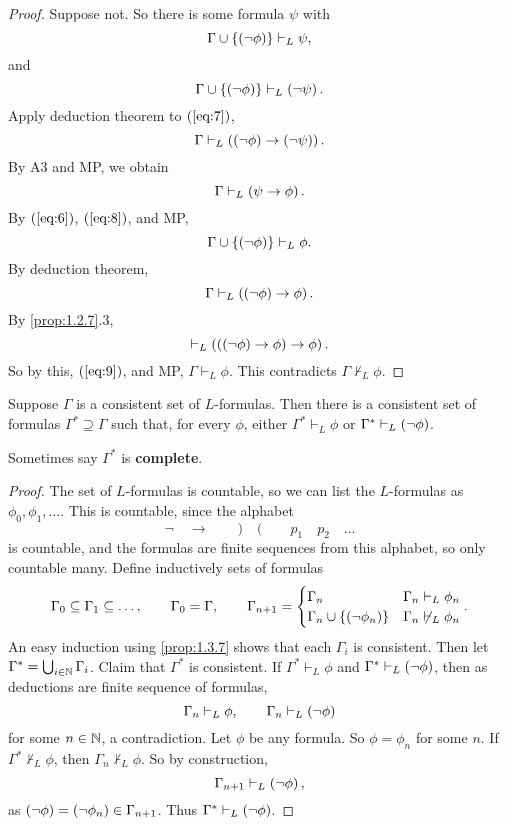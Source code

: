\begin{proof}
Suppose not. So there is some formula $ \psi $ with
\begin{equation}
\label{eq:6}
\Gamma \cup \left\{ \left( \neg \phi \right) \right\} \vdash_L \psi,
\end{equation}
and
\begin{equation}
\label{eq:7}
\Gamma \cup \left\{ \left( \neg \phi \right) \right\} \vdash_L \left( \neg \psi \right).
\end{equation}
Apply deduction theorem to $ \left( \ref{eq:7} \right) $,
$$ \Gamma \vdash_L \left( \left( \neg \phi \right) \rightarrow \left( \neg \psi \right) \right). $$
By A3 and MP, we obtain
\begin{equation}
\label{eq:8}
\Gamma \vdash_L \left( \psi \rightarrow \phi \right).
\end{equation}
By $ \left( \ref{eq:6} \right) $, $ \left( \ref{eq:8} \right) $, and MP,
$$ \Gamma \cup \left\{ \left( \neg \phi \right) \right\} \vdash_L \phi. $$
By deduction theorem,
\begin{equation}
\label{eq:9}
\Gamma \vdash_L \left( \left( \neg \phi \right) \rightarrow \phi \right).
\end{equation}
By \ref{prop:1.2.7}.$ 3 $,
$$ \vdash_L \left( \left( \left( \neg \phi \right) \rightarrow \phi \right) \rightarrow \phi \right). $$
So by this, $ \left( \ref{eq:9} \right) $, and MP, $ \Gamma \vdash_L \phi $. This contradicts $ \Gamma \not\vdash_L \phi $.
\end{proof}

\begin{proposition}
\label{prop:1.3.8}
Suppose $ \Gamma $ is a consistent set of $ L $-formulas. Then there is a consistent set of formulas $ \Gamma^* \supseteq \Gamma $ such that, for every $ \phi $, either $ \Gamma^* \vdash_L \phi $ or $ \Gamma^* \vdash_L \left( \neg \phi \right) $.
\end{proposition}

Sometimes say $ \Gamma^* $ is \textbf{complete}.

\begin{proof}
The set of $ L $-formulas is countable, so we can list the $ L $-formulas as $ \phi_0, \phi_1, \dots $. This is countable, since the alphabet
$$ \neg \quad \rightarrow \qquad ) \quad ( \qquad p_1 \quad p_2 \quad \dots $$
is countable, and the formulas are finite sequences from this alphabet, so only countable many. Define inductively sets of formulas
$$ \Gamma_0 \subseteq \Gamma_1 \subseteq \dots, \qquad \Gamma_0 = \Gamma, \qquad \Gamma_{n + 1} =
\begin{cases}
\Gamma_n & \Gamma_n \vdash_L \phi_n \\
\Gamma_n \cup \left\{ \left( \neg \phi_n \right) \right\} & \Gamma_n \not\vdash_L \phi_n
\end{cases}.
$$
An easy induction using \ref{prop:1.3.7} shows that each $ \Gamma_i $ is consistent. Then let $ \Gamma^* = \bigcup_{i \in \mathbb{N}} \Gamma_i $. Claim that $ \Gamma^* $ is consistent. If $ \Gamma^* \vdash_L \phi $ and $ \Gamma^* \vdash_L \left( \neg \phi \right) $, then as deductions are finite sequence of formulas,
$$ \Gamma_n \vdash_L \phi, \qquad \Gamma_n \vdash_L \left( \neg \phi \right) $$
for some $ n \in \mathbb{N} $, a contradiction. Let $ \phi $ be any formula. So $ \phi = \phi_n $ for some $ n $. If $ \Gamma^* \not\vdash_L \phi $, then $ \Gamma_n \not\vdash_L \phi $. So by construction,
$$ \Gamma_{n + 1} \vdash_L \left( \neg \phi \right), $$
as $ \left( \neg \phi \right) = \left( \neg \phi_n \right) \in \Gamma_{n + 1} $. Thus $ \Gamma^* \vdash_L \left( \neg \phi \right) $.
\end{proof}


